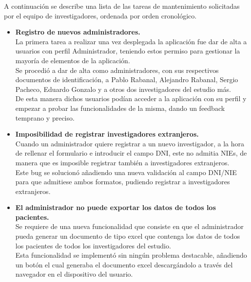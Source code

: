 A continuación se describe una lista de las tareas de mantenimiento solicitadas por el equipo de investigadores, ordenada por orden cronológico. \\
\begin{itemize}
  \item\textbf{Registro de nuevos administradores.} \\
  La primera tarea a realizar una vez desplegada la aplicación fue dar de alta a usuarios con perfil Administrador, teniendo estos permiso para gestionar la mayoría de elementos de la aplicación. \\
  \newline
  Se procedió a dar de alta como administradores, con sus respectivos documentos de identificación, a Pablo Rabanal, Alejandro Rabanal, Sergio Pacheco, Eduardo Gonzalo y a otros dos investigadores del estudio más. \\
  \newline
  De esta manera dichos usuarios podían acceder a la aplicación con su perfil y empezar a probar las funcionalidades de la misma, dando un feedback temprano y preciso.
  
  \item\textbf{Imposibilidad de registrar investigadores extranjeros.} \\
  Cuando un administrador quiere registrar a un nuevo investigador, a la hora de rellenar el formulario e introducir el campo DNI, este no admitia NIEs, de manera que es imposible registrar también a investigadores extranjeros. \\
  
  Este bug se solucionó añadiendo una nueva validación al campo DNI/NIE para que admitiese ambos formatos, pudiendo registrar a investigadores extranjeros.
  
  \item\textbf{El administrador no puede exportar los datos de todos los pacientes.} \\
  Se requiere de una nueva funcionalidad que consiste en que el administrador pueda generar un documento de tipo excel que contenga los datos de todos los pacientes de todos los investigadores del estudio. \\
  
  Esta funcionalidad se implementó sin ningún problema destacable, añadiendo un botón el cual generaba el documento excel descargándolo a través del navegador en el dispositivo del usuario.

\end{itemize}


